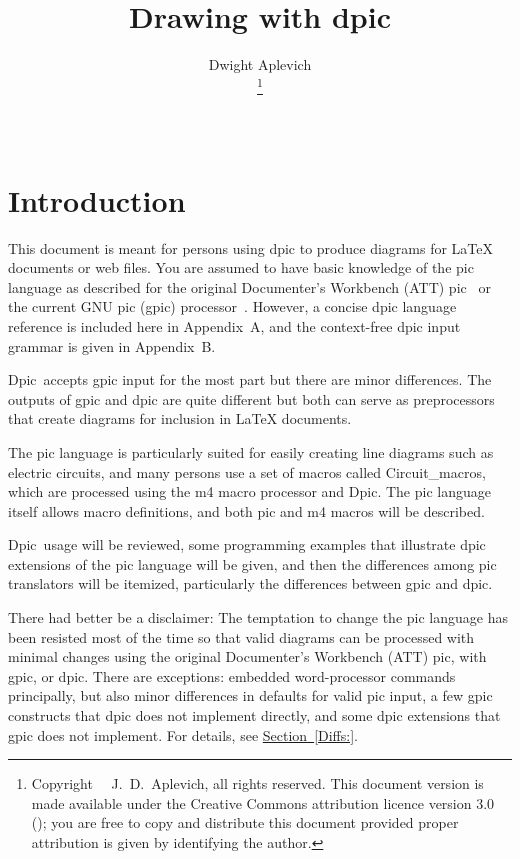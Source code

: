 \documentclass[11pt]{article}
\newcommand{\bq}{}
\newcommand{\Dpic}{{\bq Dpic}}
\newcommand{\SR}[1]{\hyperref[#1]{Section~\ref*{#1}}}
\begin{document}
\title{Drawing with dpic}
\author{Dwight Aplevich%
\date{\the\day\ \monthname[\the\month]\ \the\year}
\footnote{Copyright \textcopyright\ \the\year\ J.\ D.\ Aplevich,
all rights reserved.  This document version is made available
under the Creative Commons attribution licence version 3.0
();
you are free to copy
and distribute this document provided proper attribution is given by
identifying the author.
}}
\maketitle%
%
\begin{multicols}{2}
\tableofcontents
\end{multicols}
\section{Introduction}

This document is meant for persons using dpic to produce diagrams for
LaTeX documents or web files.  You are assumed to have basic knowledge
of the pic language as described for the original Documenter's
Workbench (ATT) pic~\cite{KRpic} or the
current GNU pic (gpic) processor~\cite{Raymond95}.
However, a concise dpic language reference is included here in
Appendix~A, and the context-free dpic input grammar is given in Appendix~B.

\Dpic\ accepts gpic input for the most part but
there are minor differences.  The outputs of gpic and dpic are quite
different but both can serve as preprocessors that create diagrams for
inclusion in LaTeX documents.

The pic language is particularly suited for easily creating line diagrams
such as electric circuits, and many persons use a set of macros
called Circuit\_macros, which are processed using the m4 macro processor
and \Dpic.
The pic language
itself allows macro definitions, and both pic and m4 macros
will be described.

\Dpic\ usage will be reviewed, some programming examples that illustrate
dpic extensions of the pic language will be given, and then
the differences among pic translators will be itemized, particularly
the differences between gpic and dpic.

   There had better be a disclaimer:  The temptation to change the pic
   language has been resisted most of the time so that valid diagrams
   can be processed with minimal changes using the original
   Documenter's Workbench (ATT) pic, with gpic, or dpic.  There are
   exceptions: embedded word-processor commands principally,
   but also minor differences in defaults for valid pic input, a few
   gpic constructs that dpic does not implement directly, and some dpic
   extensions that gpic does not implement.
   For details, see \SR{Diffs:}.
\end{document}
